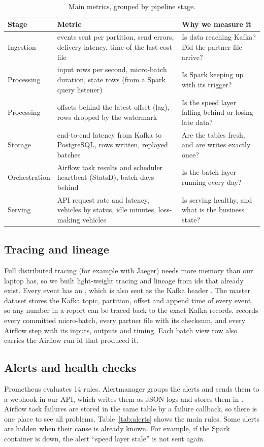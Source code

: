 \begin{table}[!htb]
\centering\small
\caption{Main metrics, grouped by pipeline stage.}
\label{tab:metrics}
\begin{tabularx}{\textwidth}{@{}P{2.2cm} P{5.4cm} L@{}}
\toprule
\textbf{Stage} & \textbf{Metric} & \textbf{Why we measure it} \\
\midrule
Ingestion & events sent per partition, send errors, delivery latency, time of the last cost file & Is data reaching Kafka? Did the partner file arrive? \\
Processing & input rows per second, micro-batch duration, state rows (from a Spark query listener) & Is Spark keeping up with its trigger? \\
Processing & offsets behind the latest offset (lag), rows dropped by the watermark & Is the speed layer falling behind or losing late data? \\
Storage & end-to-end latency from Kafka to PostgreSQL, rows written, replayed batches & Are the tables fresh, and are writes exactly once? \\
Orchestration & Airflow task results and scheduler heartbeat (StatsD), batch days behind & Is the batch layer running every day? \\
Serving & API request rate and latency, vehicles by status, idle minutes, loss-making vehicles & Is serving healthy, and what is the business state? \\
\bottomrule
\end{tabularx}
\end{table}

\subsection{Tracing and lineage}
Full distributed tracing (for example with Jaeger) needs more memory than our laptop has, so we built
light-weight tracing and lineage from ids that already exist. Every event has an , which is
also sent as the Kafka header . The master dataset stores the Kafka topic, partition, offset
and append time of every event, so any number in a report can be traced back to the exact Kafka records.
 records every committed micro-batch,  every partner file
with its checksum, and  every Airflow step with its inputs, outputs and timing.
Each batch view row also carries the Airflow run id that produced it.

\subsection{Alerts and health checks}
\label{sec:alerts}
Prometheus evaluates 14 rules. Alertmanager groups the alerts and sends them to a webhook in our API, which
writes them as JSON logs and stores them in . Airflow task failures are
stored in the same table by a failure callback, so there is one place to see all problems.
Table~\ref{tab:alerts} shows the main rules. Some alerts are hidden when their cause is already known. For
example, if the Spark container is down, the alert ``speed layer stale'' is not sent again.

